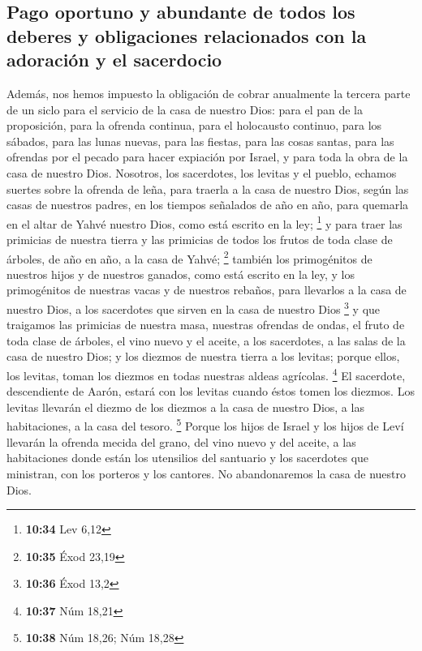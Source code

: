 \begin{paracol}{2}
\hypertarget{pago-oportuno-y-abundante-de-todos-los-deberes-y-obligaciones-relacionados-con-la-adoraciuxf3n-y-el-sacerdocio}{%
\subsection{Pago oportuno y abundante de todos los deberes y
obligaciones relacionados con la adoración y el
sacerdocio}\label{pago-oportuno-y-abundante-de-todos-los-deberes-y-obligaciones-relacionados-con-la-adoraciuxf3n-y-el-sacerdocio}}

 Además, nos hemos impuesto la obligación de cobrar
anualmente la tercera parte de un siclo para el servicio de la casa de
nuestro Dios:  para el pan de la proposición, para la
ofrenda continua, para el holocausto continuo, para los sábados, para
las lunas nuevas, para las fiestas, para las cosas santas, para las
ofrendas por el pecado para hacer expiación por Israel, y para toda la
obra de la casa de nuestro Dios.  Nosotros, los
sacerdotes, los levitas y el pueblo, echamos suertes sobre la ofrenda de
leña, para traerla a la casa de nuestro Dios, según las casas de
nuestros padres, en los tiempos señalados de año en año, para quemarla
en el altar de Yahvé nuestro Dios, como está escrito en la ley;
\footnote{\textbf{10:34} Lev 6,12}  y para traer las
primicias de nuestra tierra y las primicias de todos los frutos de toda
clase de árboles, de año en año, a la casa de Yahvé; \footnote{\textbf{10:35}
  Éxod 23,19}  también los primogénitos de nuestros hijos
y de nuestros ganados, como está escrito en la ley, y los primogénitos
de nuestras vacas y de nuestros rebaños, para llevarlos a la casa de
nuestro Dios, a los sacerdotes que sirven en la casa de nuestro Dios
\footnote{\textbf{10:36} Éxod 13,2}  y que traigamos las
primicias de nuestra masa, nuestras ofrendas de ondas, el fruto de toda
clase de árboles, el vino nuevo y el aceite, a los sacerdotes, a las
salas de la casa de nuestro Dios; y los diezmos de nuestra tierra a los
levitas; porque ellos, los levitas, toman los diezmos en todas nuestras
aldeas agrícolas. \footnote{\textbf{10:37} Núm 18,21}  El
sacerdote, descendiente de Aarón, estará con los levitas cuando éstos
tomen los diezmos. Los levitas llevarán el diezmo de los diezmos a la
casa de nuestro Dios, a las habitaciones, a la casa del tesoro.
\footnote{\textbf{10:38} Núm 18,26; Núm 18,28}  Porque
los hijos de Israel y los hijos de Leví llevarán la ofrenda mecida del
grano, del vino nuevo y del aceite, a las habitaciones donde están los
utensilios del santuario y los sacerdotes que ministran, con los
porteros y los cantores. No abandonaremos la casa de nuestro Dios.


\end{paracol}

